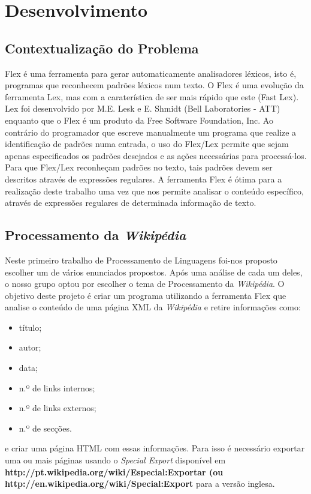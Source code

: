 \documentclass[11pt, a4paper, oneside]{article}
\begin{document}
\newpage
\section{Desenvolvimento}

\subsection{Contextualização do Problema}

Flex é uma ferramenta para gerar automaticamente analisadores léxicos, isto é, programas que reconhecem padrões léxicos num texto. O Flex é uma evolução da ferramenta Lex, mas com a caraterística de ser mais rápido que este (Fast Lex). Lex foi desenvolvido por M.E. Lesk e E. Shmidt (Bell Laboratories - ATT) enquanto que o Flex é um produto da Free Software Foundation, Inc. Ao contrário do programador que escreve manualmente um programa que realize a identificação de padrões numa entrada, o uso do Flex/Lex permite que sejam apenas especificados os padrões desejados e as ações necessárias para processá-los. Para que Flex/Lex reconheçam padrões no texto, tais padrões devem ser descritos através de expressões regulares. A ferramenta Flex é ótima para a realização deste trabalho uma vez que nos permite analisar o conteúdo específico, através de expressões regulares de determinada informação de texto.

\subsection{Processamento da \textit{Wikipédia}}
Neste primeiro trabalho de Processamento de Linguagens foi-nos proposto escolher um de vários enunciados propostos. Após uma análise de cada um deles, o nosso grupo optou por escolher o tema de Processamento da \textit{Wikipédia}. O objetivo deste projeto é criar um programa utilizando a ferramenta Flex que analise o conteúdo de uma página XML da \textit{Wikipédia} e retire informações como:
\begin{itemize}
\item título;
\item autor;
\item data;
\item n.º de links internos;
\item n.º de links externos;
\item n.º de secções.
\end{itemize}
e criar uma página HTML com essas informações. Para isso é necessário exportar uma ou mais páginas usando o \textit{Special Export} disponível em \textbf{http://pt.wikipedia.org/wiki/Especial:Exportar (ou \\http://en.wikipedia.org/wiki/Special:Export} para a versão inglesa.
\end{document}
